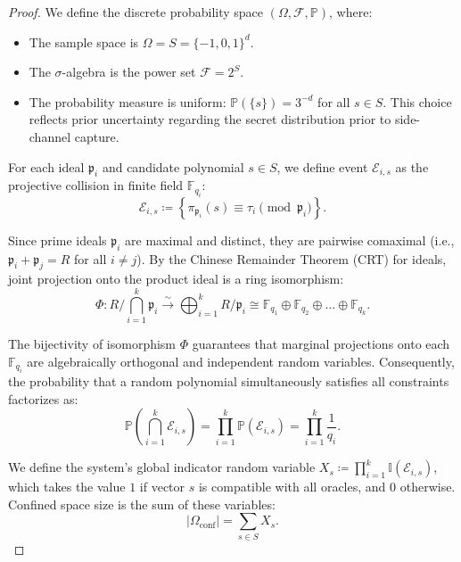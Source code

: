 \documentclass[11pt,a4paper]{article}
\theoremstyle{plain}
\theoremstyle{definition}
\numberwithin{equation}{section}
\newcommand{\FF}{\mathbb{F}}
\newcommand{\fkp}{\mathfrak{p}}
\newcommand{\Prob}{\mathbb{P}}
\begin{document}
\begin{proof}
We define the discrete probability space $(\Omega, \mathcal{F}, \Prob)$, where:
\begin{itemize}
    \item The sample space is $\Omega = S = \{-1, 0, 1\}^d$.
    \item The $\sigma$-algebra is the power set $\mathcal{F} = 2^S$.
    \item The probability measure is uniform: $\Prob(\{s\}) = 3^{-d}$ for all $s \in S$. This choice reflects prior uncertainty regarding the secret distribution prior to side-channel capture.
\end{itemize}

For each ideal $\fkp_i$ and candidate polynomial $s \in S$, we define event $\mathcal{E}_{i, s}$ as the projective collision in finite field $\FF_{q_i}$:
\begin{equation}
\mathcal{E}_{i, s} \coloneqq \left\{ \pi_{\fkp_i}(s) \equiv \tau_i \pmod{\fkp_i} \right\}.
\end{equation}

Since prime ideals $\fkp_i$ are maximal and distinct, they are pairwise comaximal (i.e., $\fkp_i + \fkp_j = R$ for all $i \neq j$). By the Chinese Remainder Theorem (CRT) for ideals, joint projection onto the product ideal is a ring isomorphism:
\begin{equation}
\Phi: R \Big/ \bigcap_{i=1}^k \fkp_i \xrightarrow{\sim} \bigoplus_{i=1}^k R/\fkp_i \cong \FF_{q_1} \oplus \FF_{q_2} \oplus \dots \oplus \FF_{q_k}.
\end{equation}

The bijectivity of isomorphism $\Phi$ guarantees that marginal projections onto each $\FF_{q_i}$ are algebraically orthogonal and independent random variables. Consequently, the probability that a random polynomial simultaneously satisfies all constraints factorizes as:
\begin{equation}
\Prob \left( \bigcap_{i=1}^k \mathcal{E}_{i, s} \right) = \prod_{i=1}^k \Prob(\mathcal{E}_{i, s}) = \prod_{i=1}^k \frac{1}{q_i}.
\end{equation}

We define the system's global indicator random variable $X_s \coloneqq \prod_{i=1}^k \mathbb{I}(\mathcal{E}_{i, s})$, which takes the value $1$ if vector $s$ is compatible with all oracles, and $0$ otherwise. Confined space size is the sum of these variables:
\begin{equation}
|\Omega_{\mathrm{conf}}| = \sum_{s \in S} X_s.
\end{equation}


\end{proof}
\end{document}
